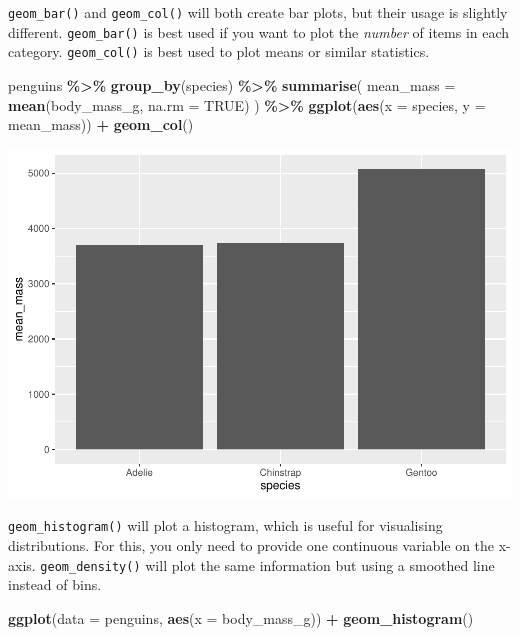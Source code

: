 \documentclass[
]{book}
\newenvironment{Shaded}{\begin{snugshade}}{\end{snugshade}}
\newcommand{\AttributeTok}[1]{\textcolor[rgb]{0.13,0.29,0.53}{#1}}
\newcommand{\ConstantTok}[1]{\textcolor[rgb]{0.56,0.35,0.01}{#1}}
\newcommand{\FunctionTok}[1]{\textcolor[rgb]{0.13,0.29,0.53}{\textbf{#1}}}
\newcommand{\NormalTok}[1]{#1}
\newcommand{\SpecialCharTok}[1]{\textcolor[rgb]{0.81,0.36,0.00}{\textbf{#1}}}
\begin{document}
\texttt{geom\_bar()} and \texttt{geom\_col()} will both create bar plots, but their usage is slightly different. \texttt{geom\_bar()} is best used if you want to plot the \emph{number} of items in each category. \texttt{geom\_col()} is best used to plot means or similar statistics.

\begin{Shaded}
\begin{Highlighting}[]
\NormalTok{penguins }\SpecialCharTok{\%\textgreater{}\%}
  \FunctionTok{group\_by}\NormalTok{(species) }\SpecialCharTok{\%\textgreater{}\%}
  \FunctionTok{summarise}\NormalTok{(}
    \AttributeTok{mean\_mass =} \FunctionTok{mean}\NormalTok{(body\_mass\_g, }\AttributeTok{na.rm =} \ConstantTok{TRUE}\NormalTok{)}
\NormalTok{  ) }\SpecialCharTok{\%\textgreater{}\%}
  \FunctionTok{ggplot}\NormalTok{(}\FunctionTok{aes}\NormalTok{(}\AttributeTok{x =}\NormalTok{ species, }\AttributeTok{y =}\NormalTok{ mean\_mass)) }\SpecialCharTok{+}
  \FunctionTok{geom\_col}\NormalTok{()}
\end{Highlighting}
\end{Shaded}

\includegraphics{_main_files/figure-latex/unnamed-chunk-56-1.pdf}

\texttt{geom\_histogram()} will plot a histogram, which is useful for visualising distributions. For this, you only need to provide one continuous variable on the x-axis. \texttt{geom\_density()} will plot the same information but using a smoothed line instead of bins.

\begin{Shaded}
\begin{Highlighting}[]
\FunctionTok{ggplot}\NormalTok{(}\AttributeTok{data =}\NormalTok{ penguins, }\FunctionTok{aes}\NormalTok{(}\AttributeTok{x =}\NormalTok{ body\_mass\_g)) }\SpecialCharTok{+} 
  \FunctionTok{geom\_histogram}\NormalTok{()}
\end{Highlighting}
\end{Shaded}
\end{document}
